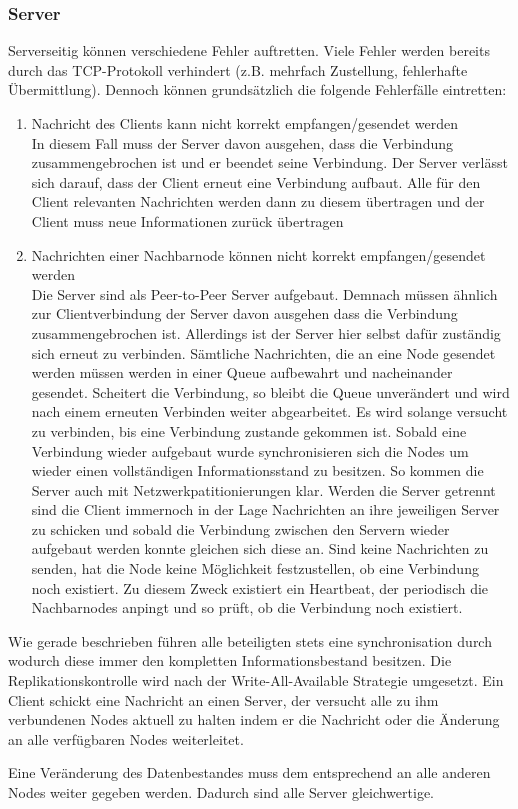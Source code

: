 \subsubsection{Server}
Serverseitig können verschiedene Fehler auftretten. Viele Fehler werden bereits durch das TCP-Protokoll verhindert (z.B. mehrfach Zustellung, fehlerhafte Übermittlung).
Dennoch können grundsätzlich die folgende Fehlerfälle eintretten:
\begin{enumerate}
    \item Nachricht des Clients kann nicht korrekt empfangen/gesendet werden\\
        In diesem Fall muss der Server davon ausgehen, dass die Verbindung zusammengebrochen ist und er beendet
        seine Verbindung. Der Server verlässt sich darauf, dass der Client erneut eine Verbindung aufbaut.
        Alle für den Client relevanten Nachrichten werden dann zu diesem übertragen und der Client muss
        neue Informationen zurück übertragen
    \item Nachrichten einer Nachbarnode können nicht korrekt empfangen/gesendet werden\\
        Die Server sind als Peer-to-Peer Server aufgebaut. Demnach müssen ähnlich zur Clientverbindung der Server davon ausgehen dass die Verbindung zusammengebrochen ist.
        Allerdings ist der Server hier selbst dafür zuständig sich erneut zu verbinden. Sämtliche Nachrichten,
        die an eine Node gesendet werden müssen werden in einer Queue aufbewahrt und nacheinander gesendet.
        Scheitert die Verbindung, so bleibt die Queue unverändert und wird nach einem erneuten Verbinden
        weiter abgearbeitet. Es wird solange versucht zu verbinden, bis eine Verbindung zustande gekommen ist.
        Sobald eine Verbindung wieder aufgebaut wurde synchronisieren sich die Nodes um wieder einen vollständigen Informationsstand zu besitzen. So kommen die Server auch mit Netzwerkpatitionierungen klar. Werden die Server getrennt sind die Client immernoch in der Lage Nachrichten an ihre jeweiligen Server zu schicken und sobald die Verbindung zwischen den Servern wieder aufgebaut werden konnte gleichen sich diese an.
        Sind keine Nachrichten zu senden, hat die Node keine Möglichkeit festzustellen,
        ob eine Verbindung noch existiert. Zu diesem Zweck existiert ein Heartbeat, der periodisch
        die Nachbarnodes anpingt und so prüft, ob die Verbindung noch existiert.
\end{enumerate}
Wie gerade beschrieben führen alle beteiligten stets eine synchronisation durch wodurch diese immer den kompletten Informationsbestand besitzen. Die Replikationskontrolle wird nach der Write-All-Available Strategie umgesetzt. Ein Client schickt eine Nachricht an einen Server, der versucht alle zu ihm verbundenen Nodes aktuell zu halten indem er die Nachricht oder die Änderung an alle verfügbaren Nodes weiterleitet.

Eine Veränderung des Datenbestandes muss dem entsprechend an alle anderen Nodes weiter gegeben werden.
Dadurch sind alle Server gleichwertige.
